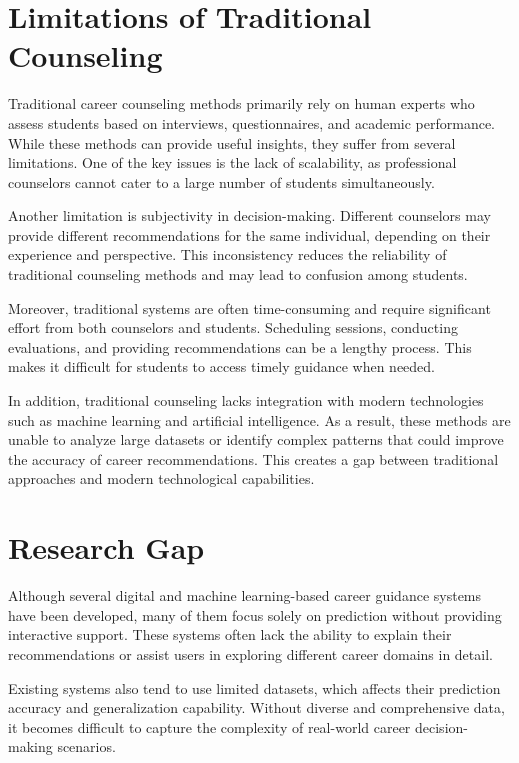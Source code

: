 \documentclass[12pt,a4paper]{report}
\begin{document}
{\section{Limitations of Traditional Counseling}

Traditional career counseling methods primarily rely on human experts who assess students based on interviews, questionnaires, and academic performance. While these methods can provide useful insights, they suffer from several limitations. One of the key issues is the lack of scalability, as professional counselors cannot cater to a large number of students simultaneously.

Another limitation is subjectivity in decision-making. Different counselors may provide different recommendations for the same individual, depending on their experience and perspective. This inconsistency reduces the reliability of traditional counseling methods and may lead to confusion among students.

Moreover, traditional systems are often time-consuming and require significant effort from both counselors and students. Scheduling sessions, conducting evaluations, and providing recommendations can be a lengthy process. This makes it difficult for students to access timely guidance when needed.

In addition, traditional counseling lacks integration with modern technologies such as machine learning and artificial intelligence. As a result, these methods are unable to analyze large datasets or identify complex patterns that could improve the accuracy of career recommendations. This creates a gap between traditional approaches and modern technological capabilities.

\section{Research Gap}

Although several digital and machine learning-based career guidance systems have been developed, many of them focus solely on prediction without providing interactive support. These systems often lack the ability to explain their recommendations or assist users in exploring different career domains in detail.

Existing systems also tend to use limited datasets, which affects their prediction accuracy and generalization capability. Without diverse and comprehensive data, it becomes difficult to capture the complexity of real-world career decision-making scenarios.

}
\end{document}
